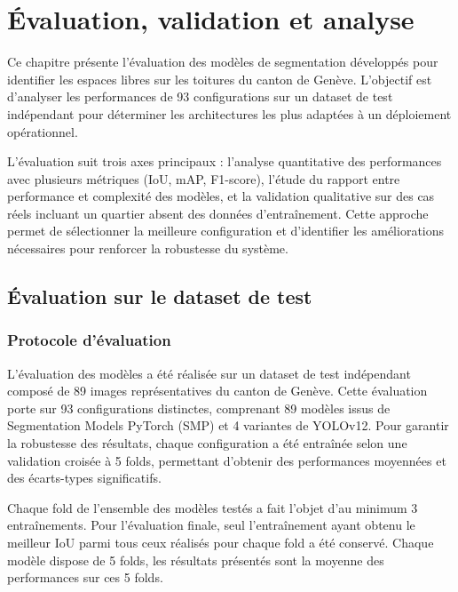 \chapter{Évaluation, validation et analyse}
\label{chap:eval_valid_modele}
Ce chapitre présente l'évaluation des modèles de segmentation développés pour identifier les espaces libres sur les toitures du canton de Genève. L'objectif est d'analyser les performances de 93 configurations sur un dataset de test indépendant pour déterminer les architectures les plus adaptées à un déploiement opérationnel.

L'évaluation suit trois axes principaux : l'analyse quantitative des performances avec plusieurs métriques (IoU, mAP, F1-score), l'étude du rapport entre performance et complexité des modèles, et la validation qualitative sur des cas réels incluant un quartier absent des données d'entraînement. Cette approche permet de sélectionner la meilleure configuration et d'identifier les améliorations nécessaires pour renforcer la robustesse du système.
\localtableofcontents

\newpage

\section{Évaluation sur le dataset de test}

\subsection{Protocole d'évaluation}

L'évaluation des modèles a été réalisée sur un dataset de test indépendant composé de 89 images représentatives du canton de Genève. Cette évaluation porte sur 93 configurations distinctes, comprenant 89 modèles issus de Segmentation Models PyTorch (SMP) et 4 variantes de YOLOv12. Pour garantir la robustesse des résultats, chaque configuration a été entraînée selon une validation croisée à 5 folds, permettant d'obtenir des performances moyennées et des écarts-types significatifs.

Chaque fold de l'ensemble des modèles testés a fait l'objet d'au minimum 3 entraînements. Pour l'évaluation finale, seul l'entraînement ayant obtenu le meilleur IoU parmi tous ceux réalisés pour chaque fold a été conservé. Chaque modèle dispose de 5 folds, les résultats présentés sont la moyenne des performances sur ces 5 folds.

